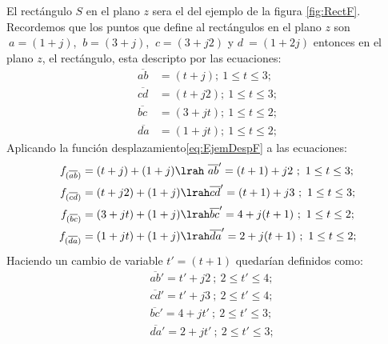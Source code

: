 El rectángulo $S$ en el plano $z$ sera  el del ejemplo de la figura \ref{fig:RectF}. Recordemos que los puntos que define al rectángulos en el plano $z$ son $\ a=(1+j)$, $\ b=(3+j)$, $\ c=(3+j2)$ y $d\ =(1+2j)$ entonces en el plano $z$, el rectángulo, esta descripto por las ecuaciones:
\begin{equation}
    \begin{aligned}
        \overline{ab}&=(t+j);\  1\leq t\leq3;\\
        \overline{cd}&=(t+j2);\  1\leq t\leq3;\\
        \overline{bc}&=(3+jt);\  1\leq t\leq2;\\
        \overline{da}&=(1+jt);\  1\leq t\leq2;
    \end{aligned}
\end{equation}
Aplicando la función desplazamiento\ref{eq:EjemDespF} a las ecuaciones:
\begin{equation}
    \begin{aligned}
         f_{(\overline{ab})}&=(t+j)+(1+j)  \lrah\ \overline{ab}'=(t+1)+j2\ ;\  1\leq t\leq3;\\
         f_{(\overline{cd})}&=(t+j2)+(1+j) \lrah \overline{cd}'=(t+1)+j3\ ;\  1\leq t\leq3;\\
         f_{(\overline{bc})}&=(3+jt)+(1+j) \lrah \overline{bc}'=4+j(t+1)\ ;\  1\leq t\leq2;\\
         f_{(\overline{da})}&=(1+jt)+(1+j) \lrah \overline{da}'=2+j(t+1)\ ;\  1\leq t\leq2;
    \end{aligned}
\end{equation}
Haciendo un cambio de variable $t'=(t+1)$ quedarían definidos como:
\begin{equation}
    \begin{aligned}
        &\overline{ab}'=t'+j2\ ;\  2\leq t'\leq4;\\
        &\overline{cd}'=t'+j3\ ;\  2\leq t'\leq4;\\
        &\overline{bc}'=4+jt'\ ;\  2\leq t'\leq3;\\
        &\overline{da}'=2+jt'\ ;\  2\leq t'\leq3;
    \end{aligned}
\end{equation}
\begin{figure}[H]
    \centering
    \begin{minipage}{0.39\textwidth}
    \centering
        
    \end{minipage}
    \begin{minipage}[t]{0.2\textwidth}
    \end{minipage}
    \begin{minipage}{0.39\textwidth}
    \centering
        
    \end{minipage}
    \caption{}
\end{figure}
